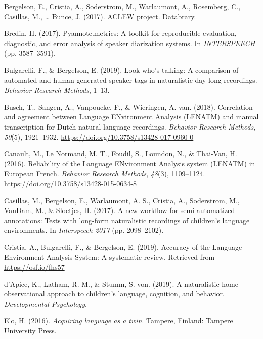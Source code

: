\documentclass[english,table,man,floatsintext]{apa6}
\begin{document}
\leavevmode\hypertarget{ref-bergelson2017}{}%
Bergelson, E., Cristia, A., Soderstrom, M., Warlaumont, A., Rosemberg, C., Casillas, M., \ldots{} Bunce, J. (2017). ACLEW project. Databrary.

\leavevmode\hypertarget{ref-bredin2017pyannote}{}%
Bredin, H. (2017). Pyannote.metrics: A toolkit for reproducible evaluation, diagnostic, and error analysis of speaker diarization systems. In \emph{INTERSPEECH} (pp. 3587--3591).

\leavevmode\hypertarget{ref-bulgarelli2019}{}%
Bulgarelli, F., \& Bergelson, E. (2019). Look who's talking: A comparison of automated and human-generated speaker tags in naturalistic day-long recordings. \emph{Behavior Research Methods}, 1--13.

\leavevmode\hypertarget{ref-Busch2018}{}%
Busch, T., Sangen, A., Vanpoucke, F., \& Wieringen, A. van. (2018). Correlation and agreement between Language ENvironment Analysis (LENATM) and manual transcription for Dutch natural language recordings. \emph{Behavior Research Methods}, \emph{50}(5), 1921--1932. \url{https://doi.org/10.3758/s13428-017-0960-0}

\leavevmode\hypertarget{ref-Canault2016}{}%
Canault, M., Le Normand, M. T., Foudil, S., Loundon, N., \& Thai-Van, H. (2016). Reliability of the Language ENvironment Analysis system (LENATM) in European French. \emph{Behavior Research Methods}, \emph{48}(3), 1109--1124. \url{https://doi.org/10.3758/s13428-015-0634-8}

\leavevmode\hypertarget{ref-casillas2017a}{}%
Casillas, M., Bergelson, E., Warlaumont, A. S., Cristia, A., Soderstrom, M., VanDam, M., \& Sloetjes, H. (2017). A new workflow for semi-automatized annotations: Tests with long-form naturalistic recordings of children's language environments. In \emph{Interspeech 2017} (pp. 2098--2102).

\leavevmode\hypertarget{ref-Cristia}{}%
Cristia, A., Bulgarelli, F., \& Bergelson, E. (2019). Accuracy of the Language Environment Analysis System: A systematic review. Retrieved from \url{https://osf.io/fhs57}

\leavevmode\hypertarget{ref-d2019naturalistic}{}%
d'Apice, K., Latham, R. M., \& Stumm, S. von. (2019). A naturalistic home observational approach to children's language, cognition, and behavior. \emph{Developmental Psychology}.

\leavevmode\hypertarget{ref-Elo}{}%
Elo, H. (2016). \emph{Acquiring language as a twin}. Tampere, Finland: Tampere University Press.
\end{document}
